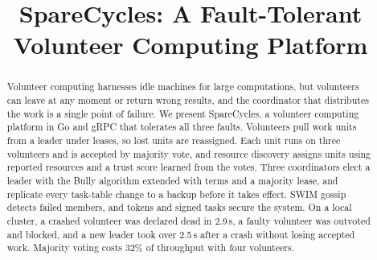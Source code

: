 \documentclass[conference]{IEEEtran}
\begin{document}
\title{SpareCycles: A Fault-Tolerant Volunteer Computing Platform}

\author{
\and
{}
\and
{}
}

\maketitle

\begin{abstract}
Volunteer computing harnesses idle machines for large computations, but volunteers can leave at any moment or return wrong results, and the coordinator that distributes the work is a single point of failure. We present SpareCycles, a volunteer computing platform in Go and gRPC that tolerates all three faults. Volunteers pull work units from a leader under leases, so lost units are reassigned. Each unit runs on three volunteers and is accepted by majority vote, and resource discovery assigns units using reported resources and a trust score learned from the votes. Three coordinators elect a leader with the Bully algorithm extended with terms and a majority lease, and replicate every task-table change to a backup before it takes effect. SWIM gossip detects failed members, and tokens and signed tasks secure the system. On a local cluster, a crashed volunteer was declared dead in 2.9\,s, a faulty volunteer was outvoted and blocked, and a new leader took over 2.5\,s after a crash without losing accepted work. Majority voting costs 32\% of throughput with four volunteers.
\end{abstract}














\end{document}
